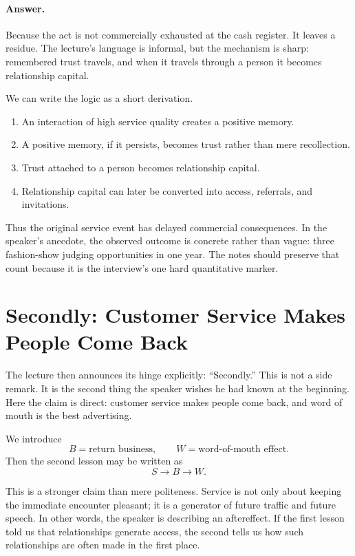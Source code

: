 \paragraph{Answer.} Because the act is not commercially exhausted at the cash register. It leaves a residue. The lecture's language is informal, but the mechanism is sharp: remembered trust travels, and when it travels through a person it becomes relationship capital.

We can write the logic as a short derivation.

\begin{enumerate}
\item An interaction of high service quality creates a positive memory.
\item A positive memory, if it persists, becomes trust rather than mere recollection.
\item Trust attached to a person becomes relationship capital.
\item Relationship capital can later be converted into access, referrals, and invitations.
\end{enumerate}

Thus the original service event has delayed commercial consequences. In the speaker's anecdote, the observed outcome is concrete rather than vague: three fashion-show judging opportunities in one year. The notes should preserve that count because it is the interview's one hard quantitative marker.

\section{Secondly: Customer Service Makes People Come Back}

The lecture then announces its hinge explicitly: ``Secondly.'' This is not a side remark. It is the second thing the speaker wishes he had known at the beginning. Here the claim is direct: customer service makes people come back, and word of mouth is the best advertising.

We introduce
\[
B = \text{return business},
\qquad
W = \text{word-of-mouth effect}.
\]
Then the second lesson may be written as
\begin{equation}
S \to B \to W.
\end{equation}

This is a stronger claim than mere politeness. Service is not only about keeping the immediate encounter pleasant; it is a generator of future traffic and future speech. In other words, the speaker is describing an aftereffect. If the first lesson told us that relationships generate access, the second tells us how such relationships are often made in the first place.

